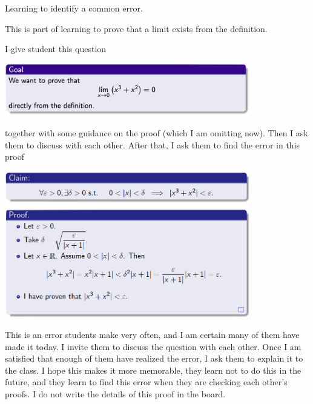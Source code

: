 \documentclass[11pt]{article}
\begin{document}
\begin{example} Learning to identify a common error.
\begin{background}
This is part of learning to prove that a limit exists from the definition. 
\end{background}
\begin{question}
I give student this question
\begin{center}
	\includegraphics[width=0.8\textwidth]{EX10a}
\end{center}
together with some guidance on the proof (which I am omitting now).   Then I ask them to discuss with each other.    After that, I ask them to find the error in this proof
\begin{center}
	\includegraphics[width=0.8\textwidth]{EX10b}
\end{center}
\end{question}
\begin{comments}
This is an error students make very often, and I am certain many of them have made it today.  I invite them to discuss the question with each other.  Once I am satisfied that enough of them have realized the error, I ask them to explain it to the class.  I hope this makes it more memorable, they learn not to do this in the future, and they learn to find this error when they are checking each other's proofs.  I do not write the details of this proof in the board.
\end{comments}
\end{example}

\end{document}
